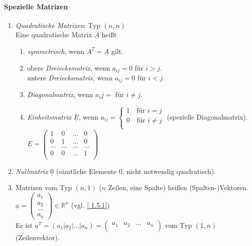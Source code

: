 \paragraph{Spezielle Matrizen}
\begin{enumerate}
\item \emph{Quadratische Matrizen}: Typ $(n,n)$\\
Eine quadratische Matrix $\underline{A}$ heißt
\begin{enumerate}
\item \emph{symmetrisch}, wenn $\underline{A}^T=\underline{A}$ gilt.
\item obere \emph{Dreiecksmatrix}, wenn $a_{ij}=0$ für $i>j$.\\
untere \emph{Dreiecksmatrix}, wenn $a_{ij}=0$ für $i<j$.
\item \emph{Diagonalmatrix}, wenn $a_ij=$ für $i\not = j$.
\item \emph{Einheitsmatrix} $\underline{E}$, wenn $a_{ij}=\begin{cases}
1 \quad \text{für }i=j\\
0 \quad \text{für } i \not = j\\
\end{cases}$ (spezielle Diagonalmatrix). \\
$\underline{E}=\begin{pmatrix}
1 & 0 & ... &0 \\
0 & 1 & ... &0 \\
... &... & ... & ...\\
0 & 0 & ... & 1 \\
\end{pmatrix}$
\end{enumerate}
\item \emph{Nullmatrix} $\underline{0}$ (sämtliche Elemente $0$, nicht notwendig quadratisch).
\item Matrizen vom Typ $(n,1)$ ($n$ Zeilen, eine Spalte) heißen (Spalten-)Vektoren.\\
$\underline{a}=\begin{pmatrix}
a_1\\
a_2\\
...\\
a_n
\end{pmatrix} \in \mathbb{R}^n$ (vgl. \ref{ 1.5.1})\\
Es ist $\underline{a}^T=(a_1| a _2 | ... | a_n)=\begin{pmatrix}
a_1 & a_2 & ... & a_n\\
\end{pmatrix}$ vom Typ $(1,n)$ (Zeilenvektor).
\end{enumerate}
